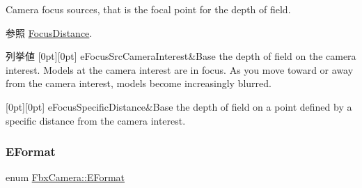Camera focus sources, that is the focal point for the depth of field. \begin{DoxySeeAlso}{参照}
\hyperlink{class_fbx_camera_af6165df26c7d25156163a3ed2a2f99c2}{Focus\+Distance}. 
\end{DoxySeeAlso}
\begin{DoxyEnumFields}{列挙値}
[0pt][0pt]{}\mbox{\label{class_fbx_camera_a1b50e7b2953019a40328599679071ad4a2063934bfeffc9520cda2fc76c07aac1}} 
e\+Focus\+Src\+Camera\+Interest&Base the depth of field on the camera interest. Models at the camera interest are in focus. As you move toward or away from the camera interest, models become increasingly blurred. \\
\hline

[0pt][0pt]{}\mbox{\label{class_fbx_camera_a1b50e7b2953019a40328599679071ad4a81da6b77be08c0270652f6a23db4d77b}} 
e\+Focus\+Specific\+Distance&Base the depth of field on a point defined by a specific distance from the camera interest. \\
\hline

\end{DoxyEnumFields}
\mbox{\label{class_fbx_camera_a88d68c983d21e4d6c0f281a8a30f0a06}} 
\subsubsection{\texorpdfstring{E\+Format}{EFormat}}
{\footnotesize\ttfamily enum \hyperlink{class_fbx_camera_a88d68c983d21e4d6c0f281a8a30f0a06}{Fbx\+Camera\+::\+E\+Format}}

